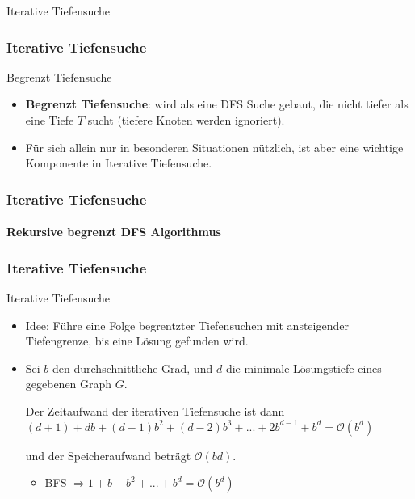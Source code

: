 \begin{frame}
		\Huge Iterative Tiefensuche
\end{frame}
	
\begin{frame}
	\frametitle{Iterative Tiefensuche}
	\begin{KITinfoblock}{Begrenzt Tiefensuche}
	\begin{itemize}
		\item \textbf{Begrenzt Tiefensuche}: wird als eine DFS Suche gebaut, die nicht tiefer als eine Tiefe $T$ sucht (tiefere Knoten werden ignoriert).
		\item Für sich allein nur in besonderen Situationen nützlich, ist aber eine wichtige Komponente in Iterative Tiefensuche.
	\end{itemize}
	\end{KITinfoblock}
\end{frame}

\begin{frame}
	\frametitle{Iterative Tiefensuche}
	\framesubtitle{Rekursive begrenzt DFS Algorithmus}
		
\end{frame}

\begin{frame}
	\frametitle{Iterative Tiefensuche}
	\begin{KITinfoblock}{Iterative Tiefensuche}
		\begin{itemize}
			\item Idee: Führe eine Folge begrentzter Tiefensuchen mit ansteigender Tiefengrenze, bis eine Lösung gefunden wird.
			
			\item Sei $b$ den durchschnittliche Grad, und $d$ die minimale Lösungstiefe eines gegebenen Graph $G$.
			  
			\vspace{0.05in}
			Der Zeitaufwand der iterativen Tiefensuche ist dann
			\linebreak[2]
			$(d+1) + db + (d-1)b^2 + (d-2)b^3 + ... + 2b^{d-1} + b^d = \mathcal{O}(b^d)$
			
			und der Speicheraufwand beträgt $\mathcal{O}(bd)$.
			\begin{itemize}
				\item BFS $\Rightarrow 1 + b + b^2 + ... + b^d = \mathcal{O}(b^d)$
			\end{itemize}			
		\end{itemize}
	\end{KITinfoblock}
	\pause
	
	
\end{frame}

